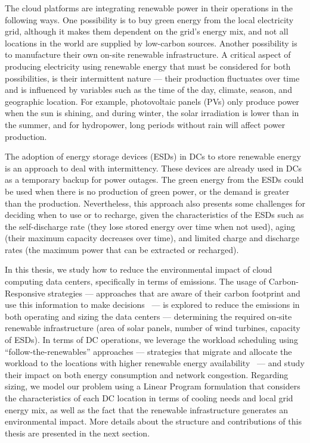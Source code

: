 The cloud platforms are integrating renewable power in their operations in the following ways. One possibility is to buy green energy from the local electricity grid, although it makes them dependent on the grid's energy mix, and not all locations in the world are supplied by low-carbon sources. Another possibility is to manufacture their own on-site renewable infrastructure. A critical aspect of producing electricity using renewable energy that must be considered for both possibilities,  is their intermittent nature --- their production fluctuates over time and is influenced by variables such as the time of the day, climate, season, and geographic location. For example, photovoltaic panels (PVs) only produce power when the sun is shining, and during winter, the solar irradiation is lower than in the summer, and for hydropower, long periods without rain will affect power production.


The adoption of energy storage devices (ESDs) in DCs to store renewable energy~\cite{wang2012_EDCS} is an approach to deal with intermittency. These devices are already used in DCs as a temporary backup for power outages. The green energy from the ESDs could be used when there is no production of green power, or the demand is greater than the production. Nevertheless, this approach also presents some challenges for deciding when to use or to recharge, given the characteristics of the ESDs such as the self-discharge rate (they lose stored energy over time when not used), aging (their maximum capacity decreases over time), and limited charge and discharge rates (the maximum power that can be extracted or recharged).

In this thesis, we study how to reduce the environmental impact of cloud computing data centers, specifically in terms of  emissions. The usage of Carbon-Responsive strategies --- approaches that are aware of their carbon footprint and use this information to make decisions~\cite{schooler2021carbonaware} --- is explored to reduce the  emissions in both operating and sizing the data centers ---  determining the required on-site renewable infrastructure (area of solar panels, number of wind turbines, capacity of ESDs). In terms of DC operations, we leverage the workload scheduling using ``follow-the-renewables'' approaches --- strategies that migrate and allocate the workload to the locations with higher renewable energy availability~\cite{shuja2016sustainable} --- and study their impact on both energy consumption and network congestion. Regarding sizing, we model our problem using a Linear Program formulation that considers the characteristics of each DC location in terms of cooling needs and local grid energy mix, as well as the fact that the renewable infrastructure generates an environmental impact. More details about the structure and contributions of this thesis are presented in the next section.
 
